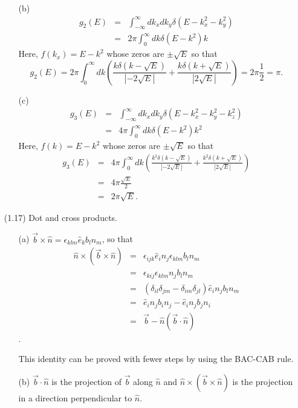 \documentclass{article}
\begin{document}
\begin{enumerate}
\begin{enumerate}
\item[(b)] 
\begin{eqnarray*}
g_2(E) &=& \int_{-\infty}^\infty dk_xdk_y\delta(E - k_x^2 - k_y^2) \\
 &=& 2\pi\int_0^\infty dk \delta(E - k^2)k 
\end{eqnarray*}
Here, $f(k_x) = E - k^2$ whose zeros are $\pm\sqrt{E}$ so that
\[
g_2(E) = 2\pi\int_0^\infty dk \left(\frac{k\delta(k - \sqrt{E})}{|-2\sqrt{E}|}
+ \frac{k\delta(k + \sqrt{E})}{|2\sqrt{E}|}\right) = 2\pi\frac{1}{2} = \pi.
\]

\item[(c)] 
\begin{eqnarray*}
g_3(E) &=& \int_{-\infty}^\infty dk_xdk_y\delta(E - k_x^2 - k_y^2 - k_z^2) \\
 &=& 4\pi\int_0^\infty dk \delta(E - k^2)k^2 
\end{eqnarray*}
Here, $f(k) = E - k^2$ whose zeros are $\pm\sqrt{E}$ so that
\begin{eqnarray*}
g_3(E) &=& 4\pi\int_0^\infty dk \left(\frac{k^2\delta(k - \sqrt{E})}{|-2\sqrt{E}|}
+ \frac{k^2\delta(k + \sqrt{E})}{|2\sqrt{E}|}\right) \\
 &=& 4\pi\frac{\sqrt{E}}{2} \\
 &=& 2\pi\sqrt{E}.
\end{eqnarray*}
\end{enumerate}

\item[(1.17)] Dot and cross products.
\begin{enumerate}
\item[(a)] $\vec{b} \times \hat{n} = \epsilon_{klm}\hat{e}_kb_ln_m$, so that
\begin{eqnarray*}
\hat{n}\times (\vec{b} \times \hat{n}) 
   &=& \epsilon_{ijk}\hat{e}_in_j\epsilon_{klm}b_ln_m \\
   &=& \epsilon_{kij}\epsilon_{klm}n_jb_ln_m \\
   &=& (\delta_{il}\delta_{jm} - \delta_{im}\delta_{jl})\hat{e}_in_jb_ln_m \\
   &=& \hat{e}_in_jb_in_j - \hat{e}_in_jb_jn_i \\
   &=& \vec{b} - \hat{n}(\vec{b}\cdot\hat{n})
\end{eqnarray*}.

This identity can be proved with fewer steps by using the BAC-CAB rule.

\item[(b)] $\vec{b}\cdot\hat{n}$ is the projection of $\vec{b}$ along $\hat{n}$
and $\hat{n} \times (\vec{b} \times \hat{n})$ is the projection in a direction 
perpendicular to $\hat{n}$.


\end{enumerate}
\end{enumerate}
\end{document}
